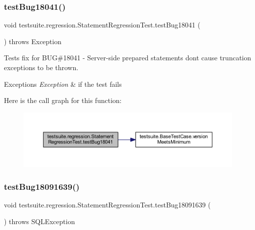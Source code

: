 \subsubsection{\texorpdfstring{test\+Bug18041()}{testBug18041()}}
{\footnotesize\ttfamily void testsuite.\+regression.\+Statement\+Regression\+Test.\+test\+Bug18041 (\begin{DoxyParamCaption}{ }\end{DoxyParamCaption}) throws Exception}

Tests fix for B\+UG\#18041 -\/ Server-\/side prepared statements don\textquotesingle{}t cause truncation exceptions to be thrown.


\begin{DoxyExceptions}{Exceptions}
{\em Exception} & if the test fails \\
\hline
\end{DoxyExceptions}
Here is the call graph for this function\+:
\nopagebreak
\begin{figure}[H]
\begin{center}
\leavevmode
\includegraphics[width=350pt]{classtestsuite_1_1regression_1_1_statement_regression_test_a0f8ea527be14f3f0a245ffcfb36f0c58_cgraph}
\end{center}
\end{figure}
\mbox{\label{classtestsuite_1_1regression_1_1_statement_regression_test_a01b6dcfb6870df0348d9c1fb80efe81c}} 
\subsubsection{\texorpdfstring{test\+Bug18091639()}{testBug18091639()}}
{\footnotesize\ttfamily void testsuite.\+regression.\+Statement\+Regression\+Test.\+test\+Bug18091639 (\begin{DoxyParamCaption}{ }\end{DoxyParamCaption}) throws S\+Q\+L\+Exception}

